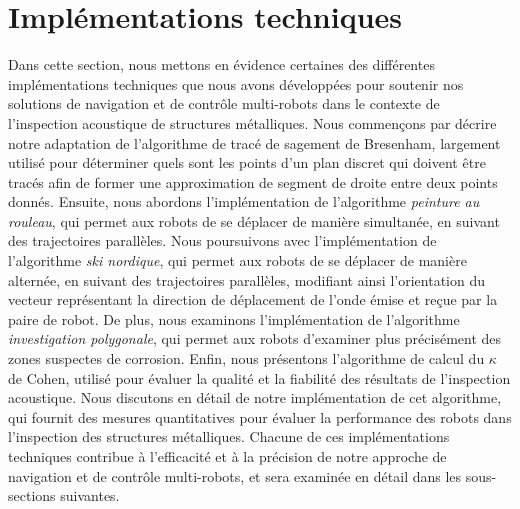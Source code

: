 \documentclass[francais,RandD]{rapportPFE}
\begin{document}
	\section{Implémentations techniques}
		Dans cette section, nous mettons en évidence certaines des différentes implémentations techniques que nous avons développées pour soutenir nos solutions de navigation et de contrôle multi-robots dans le contexte de l'inspection acoustique de structures métalliques.
		Nous commençons par décrire notre adaptation de l'algorithme de tracé de sagement de Bresenham, largement utilisé pour déterminer quels sont les points d'un plan discret qui doivent être tracés afin de former une approximation de segment de droite entre deux points donnés.
		Ensuite, nous abordons l'implémentation de l'algorithme \textit{peinture au rouleau}, qui permet aux robots de se déplacer de manière simultanée, en suivant des trajectoires parallèles.
		Nous poursuivons avec l'implémentation de l'algorithme \textit{ski nordique}, qui permet aux robots de se déplacer de manière alternée, en suivant des trajectoires parallèles, modifiant ainsi l'orientation du vecteur représentant la direction de déplacement de l'onde émise et reçue par la paire de robot.
		De plus, nous examinons l'implémentation de l'algorithme \textit{investigation polygonale}, qui permet aux robots d'examiner plus précisément des zones suspectes de corrosion.
		Enfin, nous présentons l'algorithme de calcul du $\kappa$ de Cohen, utilisé pour évaluer la qualité et la fiabilité des résultats de l'inspection acoustique.
		Nous discutons en détail de notre implémentation de cet algorithme, qui fournit des mesures quantitatives pour évaluer la performance des robots dans l'inspection des structures métalliques.
		Chacune de ces implémentations techniques contribue à l'efficacité et à la précision de notre approche de navigation et de contrôle multi-robots, et sera examinée en détail dans les sous-sections suivantes.
\end{document}
